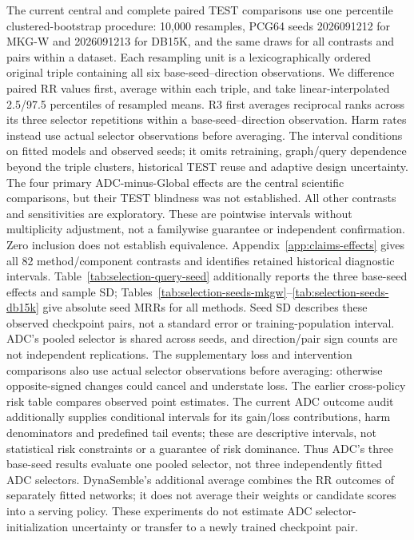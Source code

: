 \documentclass[11pt,a4paper]{article}
\begin{document}
The current central and complete paired TEST comparisons use one percentile clustered-bootstrap procedure: 10,000 resamples, PCG64 seeds 2026091212 for MKG-W and 2026091213 for DB15K, and the same draws for all contrasts and pairs within a dataset. Each resampling unit is a lexicographically ordered original triple containing all six base-seed--direction observations. We difference paired RR values first, average within each triple, and take linear-interpolated 2.5/97.5 percentiles of resampled means. R3 first averages reciprocal ranks across its three selector repetitions within a base-seed--direction observation. Harm rates instead use actual selector observations before averaging. The interval conditions on fitted models and observed seeds; it omits retraining, graph/query dependence beyond the triple clusters, historical TEST reuse and adaptive design uncertainty. The four primary ADC-minus-Global effects are the central scientific comparisons, but their TEST blindness was not established. All other contrasts and sensitivities are exploratory. These are pointwise intervals without multiplicity adjustment, not a familywise guarantee or independent confirmation. Zero inclusion does not establish equivalence. Appendix~\ref{app:claims-effects} gives all 82 method/component contrasts and identifies retained historical diagnostic intervals. Table~\ref{tab:selection-query-seed} additionally reports the three base-seed effects and sample SD; Tables~\ref{tab:selection-seeds-mkgw}--\ref{tab:selection-seeds-db15k} give absolute seed MRRs for all methods. Seed SD describes these observed checkpoint pairs, not a standard error or training-population interval. ADC's pooled selector is shared across seeds, and direction/pair sign counts are not independent replications.
The supplementary loss and intervention comparisons also use actual selector observations before averaging: otherwise opposite-signed changes could cancel and understate loss. The earlier cross-policy risk table compares observed point estimates. The current ADC outcome audit additionally supplies conditional intervals for its gain/loss contributions, harm denominators and predefined tail events; these are descriptive intervals, not statistical risk constraints or a guarantee of risk dominance.
Thus ADC's three base-seed results evaluate one pooled selector, not three independently fitted ADC selectors. DynaSemble's additional average combines the RR outcomes of separately fitted networks; it does not average their weights or candidate scores into a serving policy. These experiments do not estimate ADC selector-initialization uncertainty or transfer to a newly trained checkpoint pair.
\end{document}
